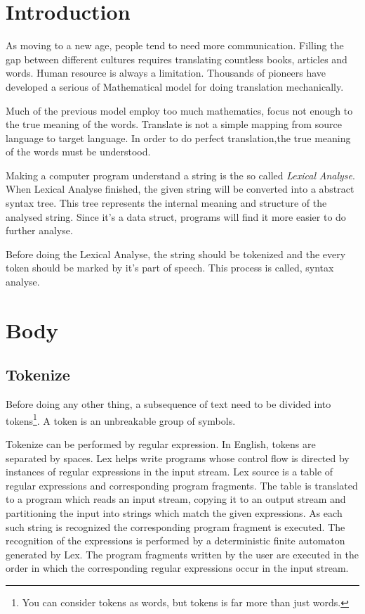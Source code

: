 \section{Introduction}

\noindent As moving to a new age, people tend to need more communication. Filling the gap between different cultures requires translating countless books, articles and words. Human resource is always a limitation. Thousands of 
pioneers have developed a serious of Mathematical model for doing translation mechanically. 

Much of the previous model employ too much mathematics,
	focus not enough to the true meaning of the words.
Translate is not a simple mapping from source language to target language.
In order to do perfect translation,the true meaning of the words must be understood. 

Making a computer program understand a string is the so called
	 \hbox{\emph{Lexical}} 	\hbox{\emph{Analyse}}. 
When Lexical Analyse finished, the given string will be converted into a abstract syntax tree. 
This tree represents the internal meaning and structure of the analysed string.
Since it's a data struct, programs will find it more easier to do further analyse.
\nocite{Compilers_Principles_Techniques_and_Tools}


Before doing the Lexical Analyse, the string should be tokenized and the every token should be marked by it's part of speech.
This process is called, syntax analyse.

\section{Body}

\subsection{Tokenize}
Before doing any other thing, a subsequence of text need to be divided into tokens\footnote{You can consider tokens as words, but tokens is far more than just words.\footnotemark}.
A token is an unbreakable group of symbols.

Tokenize can be performed by regular expression. In English, tokens are separated by spaces.
Lex\cite{Lex} helps write programs whose control flow is directed by instances of regular expressions in the input stream. Lex source is a table of regular expressions and corresponding program fragments. The table is translated to a program which reads an input stream, copying it to an output stream and partitioning the input into strings which match the given expressions. As each such string is recognized the corresponding program fragment is executed. The recognition of the expressions is performed by a deterministic finite automaton generated by Lex. The program fragments written by the user are executed in the order in which the corresponding regular expressions occur in the input stream. 

